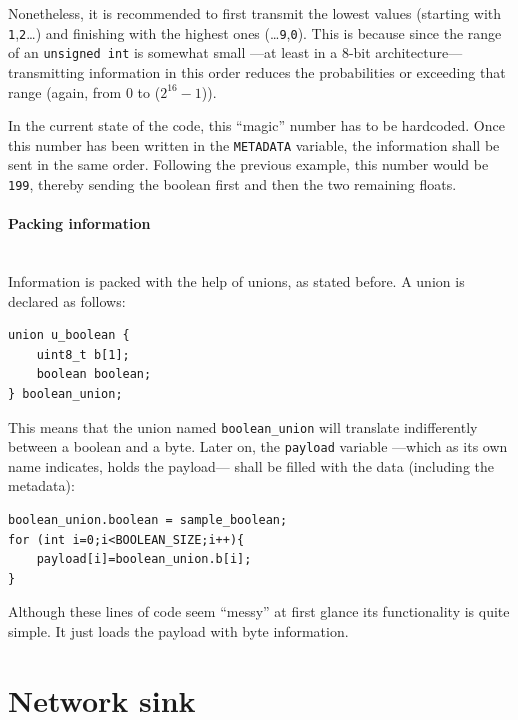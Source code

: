 Nonetheless, it is recommended to first transmit the lowest values (starting with \texttt{1},\texttt{2}\ldots) and finishing with the highest ones (\ldots\texttt{9},\texttt{0}). This is because since the range of an \texttt{unsigned int} is somewhat small ---at least in a 8-bit architecture--- transmitting information in this order reduces the probabilities or exceeding that range (again, from $0$ to ($2^{16}-1$)).

In the current state of the code, this ``magic'' number has to be hardcoded. Once this number has been written in the \texttt{METADATA} variable, the information shall be sent in the same order. Following the previous example, this number would be \texttt{199}, thereby sending the boolean first and then the two remaining floats.

\paragraph{Packing information}
~\\
Information is packed with the help of unions, as stated before. A union is declared as follows:

\begin{verbatim}
union u_boolean {
    uint8_t b[1];
    boolean boolean;
} boolean_union;
\end{verbatim}

This means that the union named \texttt{boolean\_union} will translate indifferently between a boolean and a byte. Later on, the \texttt{payload} variable ---which as its own name indicates, holds the payload--- shall be filled with the data (including the metadata):

\begin{verbatim}
boolean_union.boolean = sample_boolean;
for (int i=0;i<BOOLEAN_SIZE;i++){
    payload[i]=boolean_union.b[i];
}
\end{verbatim}

Although these lines of code seem ``messy'' at first glance its functionality is quite simple. It just loads the payload with byte information.



\section{Network sink}

